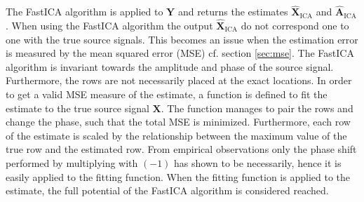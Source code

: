 The FastICA algorithm is applied to $\mathbf{Y}$ and returns the estimates $\hat{\mathbf{X}}_{\text{ICA}}$ and $\hat{\mathbf{A}}_{\text{ICA}}$. 
When using the FastICA algorithm the output $\hat{\mathbf{X}}_{\text{ICA}}$ do not correspond one to one with the true source signals. 
This becomes an issue when the estimation error is measured by the mean squared error (MSE) cf. section \ref{sec:mse}.  
The FastICA algorithm is invariant towards the amplitude and phase of the source signal.
Furthermore, the rows are not necessarily placed at the exact locations. 
In order to get a valid MSE measure of the estimate, a function is defined to fit the estimate to the true source signal $\mathbf{X}$. 
The function manages to pair the rows and change the phase, such that the total MSE is minimized. 
Furthermore, each row of the estimate is scaled by the relationship between the maximum value of the true row and the estimated row.
From empirical observations only the phase shift performed by multiplying with $(-1)$ has shown to be necessarily, hence it is easily applied to the fitting function.
When the fitting function is applied to the estimate, the full potential of the FastICA algorithm is considered reached.       

